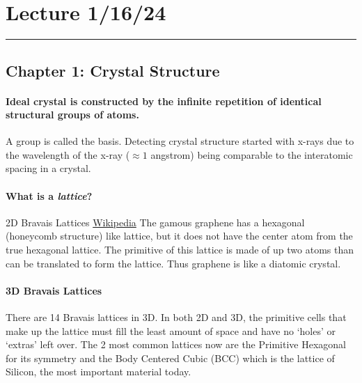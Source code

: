 \documentclass[../main.tex]{subfiles}
\begin{document}
\section{Lecture 1/16/24}
\hrule \vspace{10px}

\subsection*{Chapter 1: Crystal Structure}
\paragraph{Ideal crystal is constructed by the infinite repetition of identical structural groups of
atoms.} A group is called the basis. Detecting crystal structure started with x-rays due to the
wavelength of the x-ray ($\approx 1$ angstrom) being comparable to the interatomic spacing in a crystal.

\paragraph{What is a \emph{lattice}?}

2D Bravais Lattices \href{https://en.wikipedia.org/wiki/Bravais_lattice}{Wikipedia}
The gamous graphene has a hexagonal (honeycomb structure) like lattice, but it does not have the 
center atom from the true hexagonal lattice. The primitive of this lattice is made of up two atoms
than can be translated to form the lattice. Thus graphene is like a diatomic crystal. 

\paragraph{3D Bravais Lattices} There are 14 Bravais lattices in 3D. In both 2D and 3D, the primitive
cells that make up the lattice must fill the least amount of space and have no `holes' or `extras' left
over. The 2 most common lattices now are the Primitive Hexagonal for its symmetry and the Body
Centered Cubic (BCC) which is the lattice of Silicon, the most important material today. 
\end{document}
